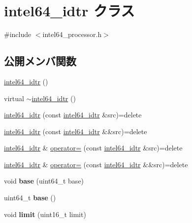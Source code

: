 \hypertarget{classintel64__idtr}{}\section{intel64\+\_\+idtr クラス}
\label{classintel64__idtr}


{\ttfamily \#include $<$intel64\+\_\+processor.\+h$>$}

\subsection*{公開メンバ関数}
\begin{DoxyCompactItemize}
\item 
\hyperlink{classintel64__idtr_a280b4fe680812df6d0cca1feeb34ec6e}{intel64\+\_\+idtr} ()
\item 
virtual \hyperlink{classintel64__idtr_a586005a32f77ee5aa08830937cbae95f}{$\sim$intel64\+\_\+idtr} ()
\item 
\hyperlink{classintel64__idtr_a535cc4ec18b49a55074ffe2d0710f8dc}{intel64\+\_\+idtr} (const \hyperlink{classintel64__idtr}{intel64\+\_\+idtr} \&src)=delete
\item 
\hyperlink{classintel64__idtr_adab09df4fd85370a17c1d6076a4d4b0e}{intel64\+\_\+idtr} (const \hyperlink{classintel64__idtr}{intel64\+\_\+idtr} \&\&src)=delete
\item 
\hyperlink{classintel64__idtr}{intel64\+\_\+idtr} \& \hyperlink{classintel64__idtr_a37c1a4964da1ffe04fc2235500d86a20}{operator=} (const \hyperlink{classintel64__idtr}{intel64\+\_\+idtr} \&src)=delete
\item 
\hyperlink{classintel64__idtr}{intel64\+\_\+idtr} \& \hyperlink{classintel64__idtr_af03603e60568900dd8006e18fa22069b}{operator=} (const \hyperlink{classintel64__idtr}{intel64\+\_\+idtr} \&\&src)=delete
\item 
\hypertarget{classintel64__idtr_abc6898b2813205ecde3b8fd81d809954}{}\label{classintel64__idtr_abc6898b2813205ecde3b8fd81d809954} 
void {\bfseries base} (uint64\+\_\+t base)
\item 
\hypertarget{classintel64__idtr_a2efd89debee1be01df7d8b3695ed4038}{}\label{classintel64__idtr_a2efd89debee1be01df7d8b3695ed4038} 
uint64\+\_\+t {\bfseries base} ()
\item 
\hypertarget{classintel64__idtr_a48f1dfe8e60abc3a68e841d7722b7238}{}\label{classintel64__idtr_a48f1dfe8e60abc3a68e841d7722b7238} 
void {\bfseries limit} (uint16\+\_\+t limit)
\item 
\hypertarget{classintel64__idtr_a048373431da288ba011a5538d8cf59c2}{}\label{classintel64__idtr_a048373431da288ba011a5538d8cf59c2} 

\end{DoxyCompactItemize}
